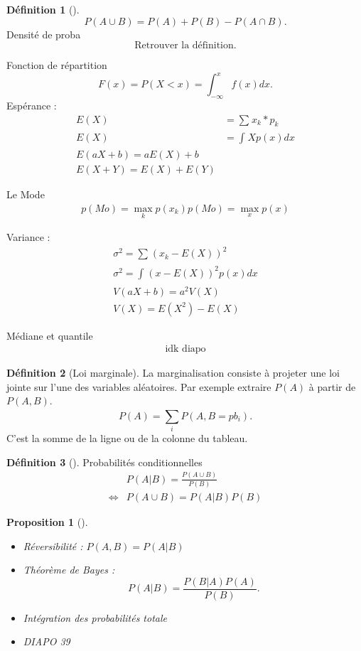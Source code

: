 \documentclass{article}
\theoremstyle{plain}%
\newtheorem{prop}[thm]{Proposition}
\theoremstyle{definition}
\newtheorem{defn}{Définition}[section]
\theoremstyle{remark}
\begin{document}
\begin{defn}[]
    \[
        P(A \cup B) = P(A) + P(B) - P(A \cap B)
    .\]
    Densité de proba 
    \[
        \text{Retrouver la définition}
    .\]
    
    Fonction de répartition
    \[
        F(x) = P(X<x) = \int_{-\infty }^{x}f(x)dx
    .\]
    Espérance : \begin{align*}
        E(X) &= \sum_{}^{}x_k*p_k \\
        E(X) &= \int_{}^{}X p(x) dx \\ 
        E(aX+b) = aE(X) + b \\
        E(X + Y) = E(X)+E(Y)
    \end{align*}

    Le Mode \begin{align*}
        p(Mo) = \max _k p(x_k)
        p(Mo) = \max _x p(x)
    \end{align*}

    Variance : \begin{align*}
        \sigma ^2 = \sum_{}^{}(x_k - E(X))^2 \\
        \sigma ^2 = \int_{}^{}(x-E(X))^2 p(x)dx \\
        V(aX+b) = a^2V(X) \\
        V(X) = E(X^2) - E(X)
    \end{align*}

    Médiane et quantile \begin{align*}
        \text{idk diapo}
    \end{align*}
\end{defn}

\begin{defn}[Loi marginale]
    La marginalisation consiste à projeter une loi jointe sur l'une des variables aléatoires. Par exemple extraire $ P(A) $ à partir de $ P(A,B) $. 
    \[
        P(A) = \sum_{i}^{}P(A, B = p b_i)
    .\]
    C'est la somme de la ligne ou de la colonne du tableau.
\end{defn}

\begin{defn}[]
    Probabilités conditionnelles
    \begin{align*}
        &P(A|B) = \frac{P(A \cup B)}{P(B)} \\ 
        \Leftrightarrow& P(A \cup B) = P(A|B)P(B)
    \end{align*}
    \begin{prop}[]
        \begin{itemize}
            \item Réversibilité : $ P(A,B) = P(A|B) $
            \item Théorème de Bayes : 
            \[
                P(A|B) = \frac{P(B|A)P(A)}{P(B)}
            .\]
            \item Intégration des probabilités totale
            \item DIAPO 39
        \end{itemize}
    \end{prop}    
    
\end{defn}
\end{document}
